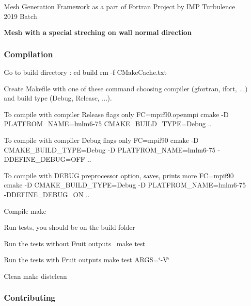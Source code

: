 Mesh Generation Framework as a part of Fortran Project by I\+MP Turbulence 2019 Batch

{\bfseries Mesh with a special streching on wall normal direction}



\subsubsection*{Compilation}


\begin{DoxyItemize}
\item Go to build directory \+: cd build rm -\/f C\+Make\+Cache.\+txt
\item Create Makefile with one of these command choosing compiler (gfortran, ifort, ...) and build type (Debug, Release, ...).
\begin{DoxyItemize}
\item To compile with compiler Release flags only {\ttfamily FC=mpif90.\+openmpi cmake -\/D P\+L\+A\+T\+F\+R\+O\+M\+\_\+\+N\+A\+ME=lmlm6-\/75 C\+M\+A\+K\+E\+\_\+\+B\+U\+I\+L\+D\+\_\+\+T\+Y\+PE=Debug ..}
\item To compile with compiler Debug flags only {\ttfamily FC=mpif90 cmake -\/D C\+M\+A\+K\+E\+\_\+\+B\+U\+I\+L\+D\+\_\+\+T\+Y\+PE=Debug -\/D P\+L\+A\+T\+F\+R\+O\+M\+\_\+\+N\+A\+ME=lmlm6-\/75 -\/\+D\+D\+E\+F\+I\+N\+E\+\_\+\+D\+E\+B\+UG=O\+FF ..}
\item To compile with D\+E\+B\+UG preprocessor option, saves, prints more {\ttfamily FC=mpif90 cmake -\/D C\+M\+A\+K\+E\+\_\+\+B\+U\+I\+L\+D\+\_\+\+T\+Y\+PE=Debug -\/D P\+L\+A\+T\+F\+R\+O\+M\+\_\+\+N\+A\+ME=lmlm6-\/75 -\/\+D\+D\+E\+F\+I\+N\+E\+\_\+\+D\+E\+B\+UG=ON ..}
\end{DoxyItemize}
\item Compile {\ttfamily make}
\item Run tests, you should be on the build folder
\begin{DoxyItemize}
\item Run the tests without Fruit outputs  {\ttfamily make test}
\item Run the tests with Fruit outputs {\ttfamily make test A\+R\+GS=\char`\"{}-\/\+V\char`\"{}}
\end{DoxyItemize}
\item Clean {\ttfamily make distclean}
\end{DoxyItemize}

\subsubsection*{Contributing}


